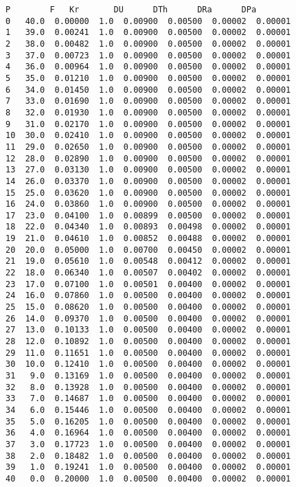 \documentclass[11pt]{article}
\makeatletter
\newcommand{\boxspacing}{\kern\kvtcb@left@rule\kern\kvtcb@boxsep}
\newcommand{\prompt}[4]{
        \ttfamily\llap{{\color{#2}[#3]:\hspace{3pt}#4}}\vspace{-\baselineskip}
    }
\makeatother
\begin{document}
            \begin{tcolorbox}[breakable, size=fbox, boxrule=.5pt, pad at break*=1mm, opacityfill=0]
\prompt{Out}{outcolor}{3}{\boxspacing}
\begin{Verbatim}[commandchars=\\\{\}]
       P        F   Kr       DU      DTh      DRa      DPa
0   40.0  0.00000  1.0  0.00900  0.00500  0.00002  0.00001
1   39.0  0.00241  1.0  0.00900  0.00500  0.00002  0.00001
2   38.0  0.00482  1.0  0.00900  0.00500  0.00002  0.00001
3   37.0  0.00723  1.0  0.00900  0.00500  0.00002  0.00001
4   36.0  0.00964  1.0  0.00900  0.00500  0.00002  0.00001
5   35.0  0.01210  1.0  0.00900  0.00500  0.00002  0.00001
6   34.0  0.01450  1.0  0.00900  0.00500  0.00002  0.00001
7   33.0  0.01690  1.0  0.00900  0.00500  0.00002  0.00001
8   32.0  0.01930  1.0  0.00900  0.00500  0.00002  0.00001
9   31.0  0.02170  1.0  0.00900  0.00500  0.00002  0.00001
10  30.0  0.02410  1.0  0.00900  0.00500  0.00002  0.00001
11  29.0  0.02650  1.0  0.00900  0.00500  0.00002  0.00001
12  28.0  0.02890  1.0  0.00900  0.00500  0.00002  0.00001
13  27.0  0.03130  1.0  0.00900  0.00500  0.00002  0.00001
14  26.0  0.03370  1.0  0.00900  0.00500  0.00002  0.00001
15  25.0  0.03620  1.0  0.00900  0.00500  0.00002  0.00001
16  24.0  0.03860  1.0  0.00900  0.00500  0.00002  0.00001
17  23.0  0.04100  1.0  0.00899  0.00500  0.00002  0.00001
18  22.0  0.04340  1.0  0.00893  0.00498  0.00002  0.00001
19  21.0  0.04610  1.0  0.00852  0.00488  0.00002  0.00001
20  20.0  0.05000  1.0  0.00700  0.00450  0.00002  0.00001
21  19.0  0.05610  1.0  0.00548  0.00412  0.00002  0.00001
22  18.0  0.06340  1.0  0.00507  0.00402  0.00002  0.00001
23  17.0  0.07100  1.0  0.00501  0.00400  0.00002  0.00001
24  16.0  0.07860  1.0  0.00500  0.00400  0.00002  0.00001
25  15.0  0.08620  1.0  0.00500  0.00400  0.00002  0.00001
26  14.0  0.09370  1.0  0.00500  0.00400  0.00002  0.00001
27  13.0  0.10133  1.0  0.00500  0.00400  0.00002  0.00001
28  12.0  0.10892  1.0  0.00500  0.00400  0.00002  0.00001
29  11.0  0.11651  1.0  0.00500  0.00400  0.00002  0.00001
30  10.0  0.12410  1.0  0.00500  0.00400  0.00002  0.00001
31   9.0  0.13169  1.0  0.00500  0.00400  0.00002  0.00001
32   8.0  0.13928  1.0  0.00500  0.00400  0.00002  0.00001
33   7.0  0.14687  1.0  0.00500  0.00400  0.00002  0.00001
34   6.0  0.15446  1.0  0.00500  0.00400  0.00002  0.00001
35   5.0  0.16205  1.0  0.00500  0.00400  0.00002  0.00001
36   4.0  0.16964  1.0  0.00500  0.00400  0.00002  0.00001
37   3.0  0.17723  1.0  0.00500  0.00400  0.00002  0.00001
38   2.0  0.18482  1.0  0.00500  0.00400  0.00002  0.00001
39   1.0  0.19241  1.0  0.00500  0.00400  0.00002  0.00001
40   0.0  0.20000  1.0  0.00500  0.00400  0.00002  0.00001
\end{Verbatim}
\end{tcolorbox}
\end{document}
